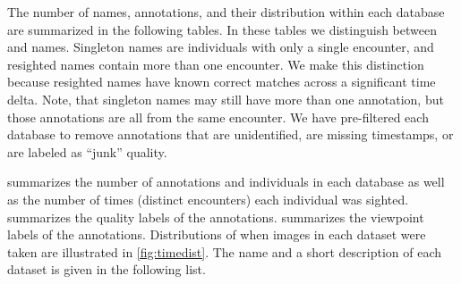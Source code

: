         \DatabaseInfo{}

        \timedist{}

        The number of names, annotations, and their distribution within each database are summarized in the
          following tables.
        In these tables we distinguish between  and  names.
        Singleton names are individuals with only a single encounter, and resighted names contain more than one
          encounter.
        We make this distinction because resighted names have known correct matches across a significant time
          delta.
        Note, that singleton names may still have more than one annotation, but those annotations are all from
          the same encounter.
        We have pre-filtered each database to remove annotations that are unidentified, are missing timestamps,
          or are labeled as ``junk'' quality.

         summarizes the number of annotations and individuals in each database as
          well as the number of times (distinct encounters) each individual was sighted.
         summarizes the quality labels of the annotations.
         summarizes the viewpoint labels of the annotations.
        Distributions of when images in each dataset were taken are illustrated in \cref{fig:timedist}.
        The name and a short description of each dataset is given in the following list.

